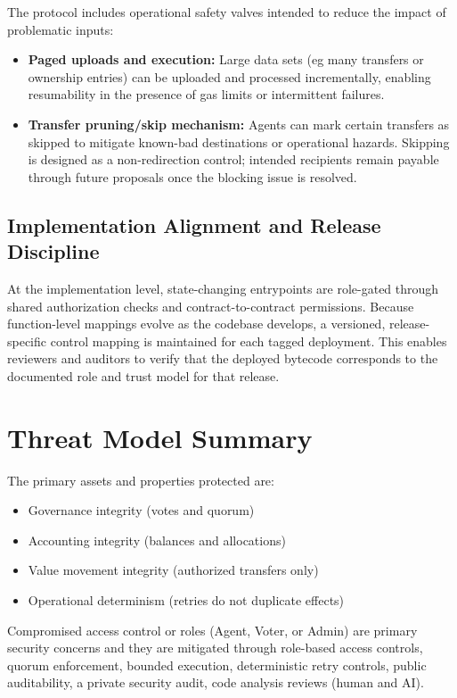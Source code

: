 \documentclass[10pt]{article}
\begin{document}
The protocol includes operational safety valves intended to reduce the impact of problematic inputs:
\begin{itemize}
    \item \textbf{Paged uploads and execution:} Large data sets (eg many transfers or ownership entries) can be uploaded and processed incrementally, enabling resumability in the presence of gas limits or intermittent failures.
    \item \textbf{Transfer pruning/skip mechanism:} Agents can mark certain transfers as skipped to mitigate known-bad destinations or operational hazards. Skipping is designed as a non-redirection control; intended recipients remain payable through future proposals once the blocking issue is resolved.
\end{itemize}

\subsection{Implementation Alignment and Release Discipline}

At the implementation level, state-changing entrypoints are role-gated through shared authorization checks and contract-to-contract permissions. Because function-level mappings evolve as the codebase develops, a versioned, release-specific control mapping is maintained for each tagged deployment. This enables reviewers and auditors to verify that the deployed bytecode corresponds to the documented role and trust model for that release.

\section{Threat Model Summary}
The primary assets and properties protected are:

\begin{itemize}
    \item Governance integrity (votes and quorum)
    \item Accounting integrity (balances and allocations)
    \item Value movement integrity (authorized transfers only)
    \item Operational determinism (retries do not duplicate effects)
\end{itemize}

Compromised access control or roles (Agent, Voter, or Admin) are primary security concerns and they
are mitigated through role-based access controls, quorum enforcement, bounded execution, deterministic retry
controls, public auditability, a private security audit, code analysis reviews (human and AI).
\end{document}
